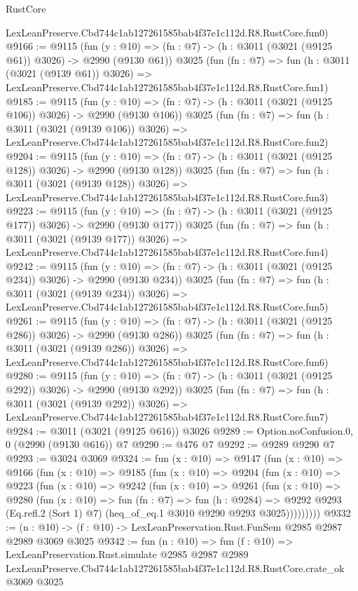 \begin{lexlean}{RustCore}
\begin{coremodule}
    LexLeanPreserve.Cbd744c1ab127261585bab4f37e1c112d.R8.RustCore.fun0)
@9166 := @9115
    (fun (y : @10) => (fn : @7) -> (h : @3011 (@3021 (@9125 @61)) @3026) -> @2990 (@9130 @61))
    @3025
    (fun (fn : @7) =>
    fun (h : @3011 (@3021 (@9139 @61)) @3026) =>
    LexLeanPreserve.Cbd744c1ab127261585bab4f37e1c112d.R8.RustCore.fun1)
@9185 := @9115
    (fun (y : @10) => (fn : @7) -> (h : @3011 (@3021 (@9125 @106)) @3026) -> @2990 (@9130 @106))
    @3025
    (fun (fn : @7) =>
    fun (h : @3011 (@3021 (@9139 @106)) @3026) =>
    LexLeanPreserve.Cbd744c1ab127261585bab4f37e1c112d.R8.RustCore.fun2)
@9204 := @9115
    (fun (y : @10) => (fn : @7) -> (h : @3011 (@3021 (@9125 @128)) @3026) -> @2990 (@9130 @128))
    @3025
    (fun (fn : @7) =>
    fun (h : @3011 (@3021 (@9139 @128)) @3026) =>
    LexLeanPreserve.Cbd744c1ab127261585bab4f37e1c112d.R8.RustCore.fun3)
@9223 := @9115
    (fun (y : @10) => (fn : @7) -> (h : @3011 (@3021 (@9125 @177)) @3026) -> @2990 (@9130 @177))
    @3025
    (fun (fn : @7) =>
    fun (h : @3011 (@3021 (@9139 @177)) @3026) =>
    LexLeanPreserve.Cbd744c1ab127261585bab4f37e1c112d.R8.RustCore.fun4)
@9242 := @9115
    (fun (y : @10) => (fn : @7) -> (h : @3011 (@3021 (@9125 @234)) @3026) -> @2990 (@9130 @234))
    @3025
    (fun (fn : @7) =>
    fun (h : @3011 (@3021 (@9139 @234)) @3026) =>
    LexLeanPreserve.Cbd744c1ab127261585bab4f37e1c112d.R8.RustCore.fun5)
@9261 := @9115
    (fun (y : @10) => (fn : @7) -> (h : @3011 (@3021 (@9125 @286)) @3026) -> @2990 (@9130 @286))
    @3025
    (fun (fn : @7) =>
    fun (h : @3011 (@3021 (@9139 @286)) @3026) =>
    LexLeanPreserve.Cbd744c1ab127261585bab4f37e1c112d.R8.RustCore.fun6)
@9280 := @9115
    (fun (y : @10) => (fn : @7) -> (h : @3011 (@3021 (@9125 @292)) @3026) -> @2990 (@9130 @292))
    @3025
    (fun (fn : @7) =>
    fun (h : @3011 (@3021 (@9139 @292)) @3026) =>
    LexLeanPreserve.Cbd744c1ab127261585bab4f37e1c112d.R8.RustCore.fun7)
@9284 := @3011 (@3021 (@9125 @616)) @3026
@9289 := Option.noConfusion.{0, 0} (@2990 (@9130 @616)) @7
@9290 := @476 @7
@9292 := @9289 @9290 @7
@9293 := @3024 @3069
@9324 := fun (x : @10) =>
  @9147
    (fun (x : @10) =>
    @9166
      (fun (x : @10) =>
      @9185
        (fun (x : @10) =>
        @9204
          (fun (x : @10) =>
          @9223
            (fun (x : @10) =>
            @9242
              (fun (x : @10) =>
              @9261
                (fun (x : @10) =>
                @9280
                  (fun (x : @10) =>
                  fun (fn : @7) =>
                  fun (h : @9284) =>
                  @9292
                    @9293
                    (Eq.refl.{2} (Sort 1) @7)
                    (heq_of_eq.{1} @3010 @9290 @9293 @3025)))))))))
@9332 := (n : @10) -> (f : @10) -> LexLeanPreservation.Rust.FunSem @2985 @2987 @2989 @3069 @3025
@9342 := fun (n : @10) =>
  fun (f : @10) =>
  LexLeanPreservation.Rust.simulate
    @2985
    @2987
    @2989
    LexLeanPreserve.Cbd744c1ab127261585bab4f37e1c112d.R8.RustCore.crate_ok
    @3069
    @3025
\end{coremodule}
\end{lexlean}
